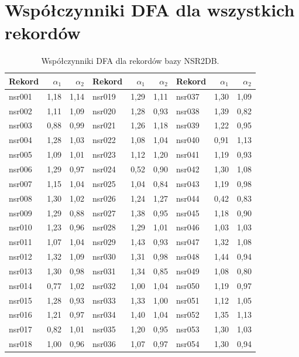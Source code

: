 \documentclass[11pt,a4paper]{article}
\begin{document}
\section{Współczynniki DFA dla wszystkich rekordów}
\begin{table}[ht]
  \centering
  \small
  \caption{Współczynniki DFA dla rekordów bazy NSR2DB.}
  \label{tab:nsr-all}
  \begin{tabular}{lrr|lrr|lrr}
  \toprule
  Rekord & $\alpha_1$ & $\alpha_2$ & Rekord & $\alpha_1$ & $\alpha_2$ & Rekord & $\alpha_1$ & $\alpha_2$ \\
  \midrule
  nsr001 & 1,18 & 1,14 & nsr019 & 1,29 & 1,11 & nsr037 & 1,30 & 1,09 \\
  nsr002 & 1,11 & 1,09 & nsr020 & 1,28 & 0,93 & nsr038 & 1,39 & 0,82 \\
  nsr003 & 0,88 & 0,99 & nsr021 & 1,26 & 1,18 & nsr039 & 1,22 & 0,95 \\
  nsr004 & 1,28 & 1,03 & nsr022 & 1,08 & 1,04 & nsr040 & 0,91 & 1,13 \\
  nsr005 & 1,09 & 1,01 & nsr023 & 1,12 & 1,20 & nsr041 & 1,19 & 0,93 \\
  nsr006 & 1,29 & 0,97 & nsr024 & 0,52 & 0,90 & nsr042 & 1,30 & 1,08 \\
  nsr007 & 1,15 & 1,04 & nsr025 & 1,04 & 0,84 & nsr043 & 1,19 & 0,98 \\
  nsr008 & 1,30 & 1,02 & nsr026 & 1,24 & 1,27 & nsr044 & 0,42 & 0,83 \\
  nsr009 & 1,29 & 0,88 & nsr027 & 1,38 & 0,95 & nsr045 & 1,18 & 0,90 \\
  nsr010 & 1,23 & 0,96 & nsr028 & 1,29 & 1,01 & nsr046 & 1,03 & 1,03 \\
  nsr011 & 1,07 & 1,04 & nsr029 & 1,43 & 0,93 & nsr047 & 1,32 & 1,08 \\
  nsr012 & 1,32 & 1,09 & nsr030 & 1,31 & 0,98 & nsr048 & 1,44 & 0,94 \\
  nsr013 & 1,30 & 0,98 & nsr031 & 1,34 & 0,85 & nsr049 & 1,08 & 0,80 \\
  nsr014 & 0,77 & 1,02 & nsr032 & 1,00 & 1,04 & nsr050 & 1,19 & 0,97 \\
  nsr015 & 1,28 & 0,93 & nsr033 & 1,33 & 1,00 & nsr051 & 1,12 & 1,05 \\
  nsr016 & 1,21 & 0,97 & nsr034 & 1,40 & 1,04 & nsr052 & 1,35 & 1,13 \\
  nsr017 & 0,82 & 1,01 & nsr035 & 1,20 & 0,95 & nsr053 & 1,30 & 1,03 \\
  nsr018 & 1,00 & 0,96 & nsr036 & 1,07 & 0,97 & nsr054 & 1,30 & 0,94 \\
  \bottomrule
  \end{tabular}
\end{table}
\end{document}

